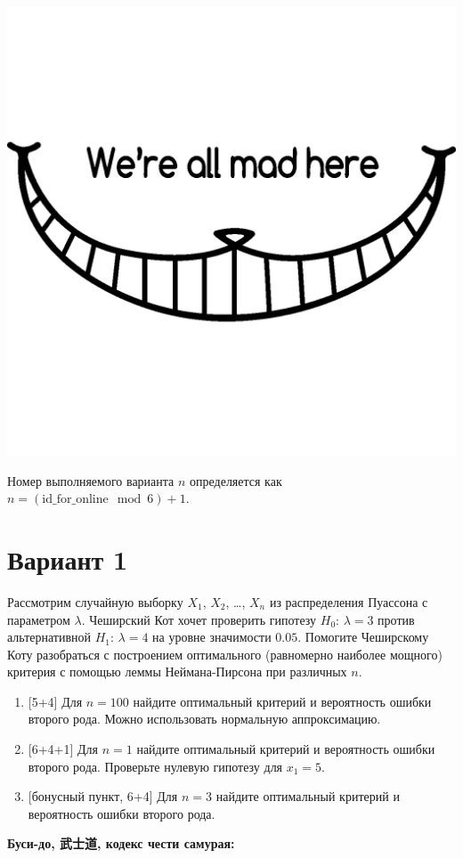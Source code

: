 \documentclass[12pt]{article}
\newcommand \id {\mathrm{id}\_\mathrm{for}\_\mathrm{online}}
\begin{document}
\begin{center}
  \begin{minipage}{5cm}
    \includegraphics[height=30ex]{cheshire_cat.png}
  \end{minipage}
\end{center}
  
\newpage

Номер выполняемого варианта $n$ определяется как $n=(\id \mod 6)+1$. 

\section*{Вариант 1}


Рассмотрим случайную выборку $X_1$, $X_2$, \ldots, $X_n$ из распределения Пуассона с параметром $\lambda$. 
Чеширский Кот хочет проверить гипотезу $H_0$: $\lambda = 3$ против альтернативной $H_1$: $\lambda = 4$ на уровне
значимости $0.05$. Помогите Чеширскому Коту разобраться с построением оптимального (равномерно наиболее мощного)
критерия с помощью леммы Неймана-Пирсона при различных $n$.

\begin{enumerate}
  \item {[5+4]} Для $n=100$ найдите оптимальный критерий и вероятность ошибки второго рода. Можно использовать нормальную аппроксимацию.
  \item {[6+4+1]} Для $n=1$ найдите оптимальный критерий и вероятность ошибки второго рода. Проверьте нулевую гипотезу для $x_1 = 5$. 
  \item {[бонусный пункт, 6+4]} Для $n=3$ найдите оптимальный критерий и вероятность ошибки второго рода.
\end{enumerate}

\vspace{15mm}


\textbf{Буси-до, 武士道, кодекс чести самурая:}

\vspace{5mm}
\end{document}
